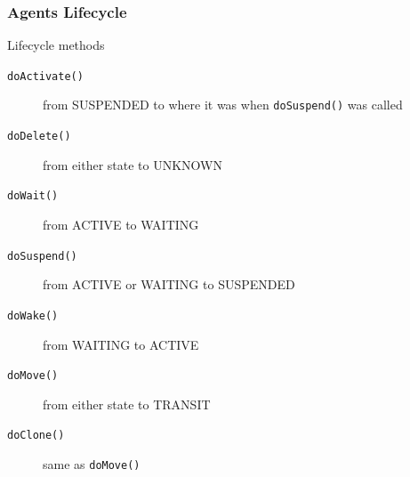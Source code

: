 \documentclass{beamer}\mode<presentation>{\usetheme{AMSCesenaPurpleAndGold}}
\begin{document}
\begin{frame}[c]\frametitle{Agents Lifecycle}
    \begin{block}{Lifecycle methods}
        \begin{description}
            \item[\texttt{doActivate()}] from SUSPENDED to where it was when \texttt{doSuspend()} was called
            \item[\texttt{doDelete()}] from either state to UNKNOWN
            \item[\texttt{doWait()}] from ACTIVE to WAITING
            \item[\texttt{doSuspend()}] from ACTIVE or WAITING to SUSPENDED
            \item[\texttt{doWake()}] from WAITING to ACTIVE
            \item[\texttt{doMove()}] from either state to TRANSIT
            \item[\texttt{doClone()}] same as \texttt{doMove()}
        \end{description}
    \end{block}
\end{frame}
\end{document}
